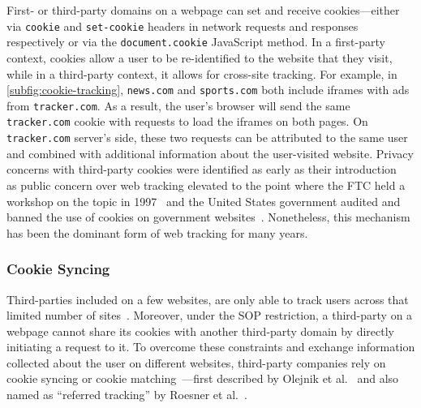 First- or third-party domains on a webpage can set and receive cookies---either via \texttt{cookie} and \texttt{set-cookie} headers in network requests and responses respectively or via the \texttt{document.cookie} JavaScript method. 
%
In a first-party context, cookies allow a user to be re-identified to the website that they visit, while in a third-party context, it allows for cross-site tracking. 
%
For example, in \autoref{subfig:cookie-tracking}, \texttt{news.com} and \texttt{sports.com} both include iframes with ads from \texttt{tracker.com}. 
%
As a result, the user’s browser will send the same \texttt{tracker.com} cookie with requests to load the iframes on both pages. 
%
On \texttt{tracker.com} server's side, these two requests can be attributed to the same user and combined with additional information about the user-visited website. 
%
Privacy concerns with third-party cookies were identified as early as their introduction~\cite{montulliHTTPStateManagement1997,kristolHTTPCookiesStandards2001} as public concern over web tracking elevated to the point where the FTC held a workshop on the topic in 1997~\cite{ftcWorkshopConsumerInformation1997} and the United States government audited and banned the use of cookies on government websites~\cite{SenatorRaisesPrivacy2001}. 
%
Nonetheless, this mechanism has been the dominant form of web tracking for many years.







\subsubsection{Cookie Syncing}
Third-parties included on a few websites, are only able to track users across that limited number of sites~\cite{roesnerDetectingDefendingThirdparty2012,lernerInternetJonesRaiders2016}. 
%
Moreover, under the SOP restriction, a third-party on a webpage cannot share its cookies with another third-party domain by directly initiating a request to it.
%
To overcome these constraints and exchange information collected about the user on different websites, third-party companies rely on cookie syncing or cookie matching~\cite{acarWebNeverForgets2014,englehardtOnlineTracking1millionsite2016,bashirTracingInformationFlows2016,papadopoulosCookieSynchronizationEverything2019,fouadMissedFilterLists2020,urbanMeasuringImpactGDPR2020}---first described by Olejnik et al.~\cite{olejnikSellingPrivacyAuction2014} and also named as ``referred tracking'' by Roesner et al.~\cite{roesnerDetectingDefendingThirdparty2012}. 

